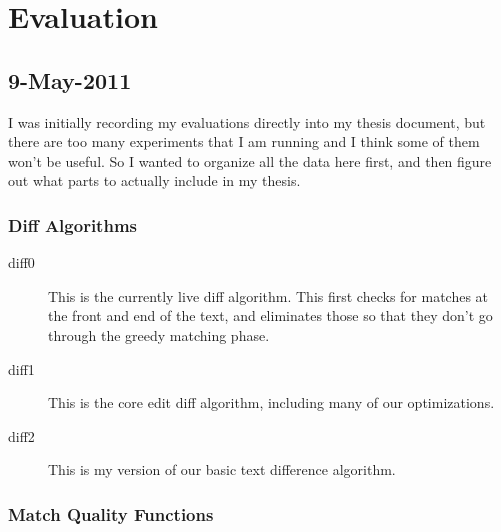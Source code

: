 \section{Evaluation}

\subsection{9-May-2011}

I was initially recording my evaluations directly into my thesis
document, but there are too many experiments that I am running
and I think some of them won't be useful.
So I wanted to organize all the data here first, and then
figure out what parts to actually include in my thesis.

\subsubsection{Diff Algorithms}

\begin{description}
\item[diff0] This is the currently live diff algorithm.
	This first checks for matches at the front and end of
	the text, and eliminates those so that they don't go
	through the greedy matching phase.
\item[diff1] This is the core edit diff algorithm, including
	many of our optimizations.
\item[diff2] This is my version of our basic text difference algorithm.
\end{description}

\subsubsection{Match Quality Functions}

